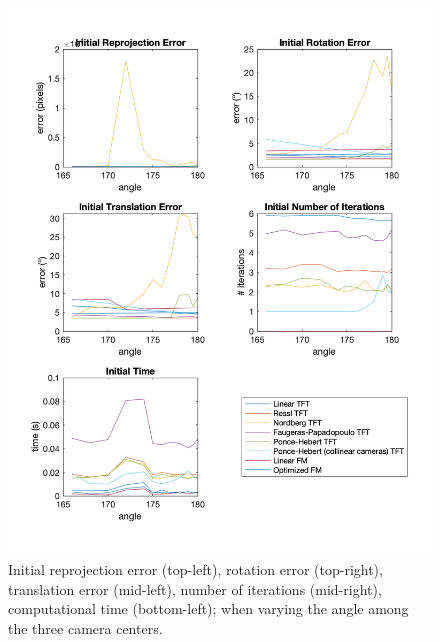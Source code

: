 \begin{figure}[p]
	\centering
	\includegraphics[width=1\textwidth]{Experiments/Synthetic/angle/INITanglePlots.png}
	\caption{Initial reprojection error (top-left), rotation error (top-right), translation error (mid-left), number of iterations (mid-right), computational time (bottom-left); when varying the angle among the three camera centers.}
	\label{fig:initAnglePlot}
\end{figure}

